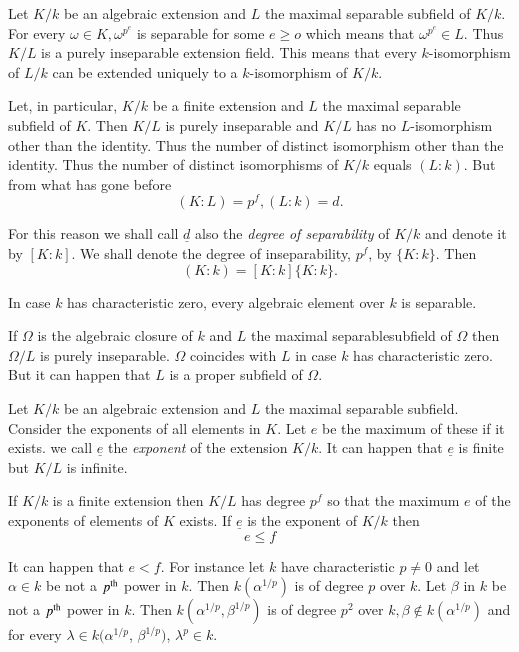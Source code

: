 Let $K/k$ be an algebraic extension and $L$ the maximal separable
subfield of $K/k$. For every $\omega \in K, \omega ^{p^e}$ is
separable for some $e \geq o $ which means that $\omega ^{p^e} \in
L$. Thus $K/ L$ is a purely inseparable extension field. This means
that every $k$-isomorphism of $L/k$ can be extended uniquely to a
$k$-isomorphism of $K/k$.  

Let, in particular, $K/k$ be a finite extension and $L$ the maximal
separable subfield of $K$. Then $K/L$ is purely inseparable and $K/L$
has no $L$-isomorphism other than the identity. Thus the number of
distinct isomorphism other than the identity. Thus the number of
distinct isomorphisms of $K/k$ equals $(L : k)$. But from what has
gone before  
$$
(K : L ) = p^f, (L : k) = d.
$$

For this reason we shall call $\underline{d}$ also the \textit{degree
  of separability} of $K / k$ and denote it by $[ K : k]$. We shall
denote the degree of inseparability, $p^f$, by $\big\{ K :
k\big\}$. Then  
$$
(K : k) = [K : k] \big\{ K : k\big\}. 
$$

\begin{note*}%
 In case $k$ has characteristic zero, every algebraic element over $k$
 is separable.  
 \end{note*}
 
If $\Omega$ is the algebraic closure of $k$ and $L$ the maximal
separable\pageoriginale subfield of $\Omega$ then $\Omega / L$  is purely
inseparable. $\Omega$ coincides with $L$ in case $k$ has characteristic
zero. But it can happen that $L$ is a proper subfield of $\Omega$.  

Let $K /k$ be an algebraic extension and $L$ the maximal separable
subfield. Consider the exponents of all elements in $K$. Let $e$ be
the maximum of these if it exists. we call $\underline{e}$ the
\textit{exponent} of the extension $K/k$. It can happen that
$\underline{e}$ is finite but $K/L$ is infinite. 

If $K/k$ is a finite extension then $K /L$ has degree $p^f$ so that
the maximum $e$ of the exponents of elements of $K$ exists. If
$\underline{e}$ is the exponent of $K/k$ then  
$$
e \leq f
$$

It can happen that $e < f$. For instance let $k$ have characteristic
$p \neq 0$ and let $ \alpha \in k$ be not a $p^{\rm th}$ power in $k$. Then $k
(\alpha^{ 1 /p})$ is of degree $p$ over $k$. Let $\beta$ in $k$ be
not a $p^{\rm th}$ power in $k$. Then $k(\alpha^{ 1/p} , \beta^{ 1/p})$ is of
degree $p^2$ over $k, \beta \not\in k(\alpha^{ 1/p})$ and for every
$\lambda \in k(\alpha^{ 1/p}$, $\beta^{ 1/p})$, $\lambda ^p \in k$. 


